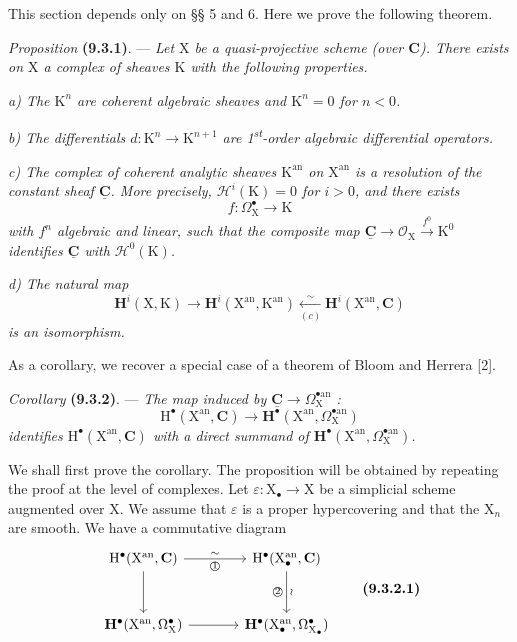 \documentclass[11pt,leqno]{article}
\begin{document}
This section depends only on §§ 5 and 6. Here we prove the following theorem.

\textit{Proposition} \textbf{(9.3.1)}. — \textit{Let \(\mathrm{X}\) be a quasi-projective scheme (over \(\mathbf{C}\)). There exists on \(\mathrm{X}\) a complex of sheaves \(\mathrm{K}\) with the following properties.}

\textit{a) The \(\mathrm{K}^{n}\) are coherent algebraic sheaves and \(\mathrm{K}^{n}=0\) for \(n<0\).}

\textit{b) The differentials \(d:\mathrm{K}^{n}\to\mathrm{K}^{n+1}\) are 1\textsuperscript{st}-order algebraic differential operators.}

\textit{c) The complex of coherent analytic sheaves \(\mathrm{K}^{\mathrm{an}}\) on \(\mathrm{X}^{\mathrm{an}}\) is a resolution of the constant sheaf \(\underline{\mathbf{C}}\). More precisely, \(\mathscr{H}^{i}(\mathrm{K})=0\) for \(i>0\), and there exists}
\[
f:\Omega_{\mathrm{X}}^{\bullet}\to\mathrm{K}
\]
\textit{with \(f^{n}\) algebraic and linear, such that the composite map \(\underline{\mathbf{C}}\to\mathscr{O}_{\mathrm{X}}\xrightarrow{f^{0}}\mathrm{K}^{0}\) identifies \(\underline{\mathbf{C}}\) with \(\mathscr{H}^{0}(\mathrm{K})\).}

\textit{d) The natural map}
\[
\mathbf{H}^{i}(\mathrm{X},\mathrm{K})
\to\mathbf{H}^{i}(\mathrm{X}^{\mathrm{an}},\mathrm{K}^{\mathrm{an}})
\xleftarrow[(c)]{\sim}
\mathbf{H}^{i}(\mathrm{X}^{\mathrm{an}},\mathbf{C})
\]
\textit{is an isomorphism.}

As a corollary, we recover a special case of a theorem of Bloom and Herrera [2].

\textit{Corollary} \textbf{(9.3.2)}. — \textit{The map induced by \(\underline{\mathbf{C}}\to\Omega_{\mathrm{X}}^{\bullet\mathrm{an}}\) :}
\[
\mathrm{H}^{\bullet}(\mathrm{X}^{\mathrm{an}},\mathbf{C})
\to\mathbf{H}^{\bullet}(\mathrm{X}^{\mathrm{an}},\Omega_{\mathrm{X}}^{\bullet\mathrm{an}})
\]
\textit{identifies \(\mathrm{H}^{\bullet}(\mathrm{X}^{\mathrm{an}},\mathbf{C})\) with a direct summand of \(\mathbf{H}^{\bullet}(\mathrm{X}^{\mathrm{an}},\Omega_{\mathrm{X}}^{\bullet\mathrm{an}})\).}

We shall first prove the corollary. The proposition will be obtained by repeating the proof at the level of complexes. Let \(\varepsilon:\mathrm{X}_{\bullet}\to\mathrm{X}\) be a simplicial scheme augmented over \(\mathrm{X}\). We assume that \(\varepsilon\) is a proper hypercovering and that the \(\mathrm{X}_{n}\) are smooth. We have a commutative diagram
\[
\begin{tikzcd}[ampersand replacement=\&, column sep=large, row sep=3em]
\mathrm{H}^{\bullet}(\mathrm{X}^{\mathrm{an}},\mathbf{C})
  \arrow[r, "\sim", "\text{\textcircled{1}}"']
  \arrow[d]
\&
\mathrm{H}^{\bullet}(\mathrm{X}_{\bullet}^{\mathrm{an}},\mathbf{C})
  \arrow[d, "\wr", "\text{\textcircled{2}}"']
\\
\mathbf{H}^{\bullet}(\mathrm{X}^{\mathrm{an}},\Omega_{\mathrm{X}}^{\bullet})
  \arrow[r]
\&
\mathbf{H}^{\bullet}(\mathrm{X}_{\bullet}^{\mathrm{an}},\Omega_{\mathrm{X}_{\bullet}}^{\bullet})
\end{tikzcd}
\tag*{\textbf{(9.3.2.1)}}
\]
\end{document}
